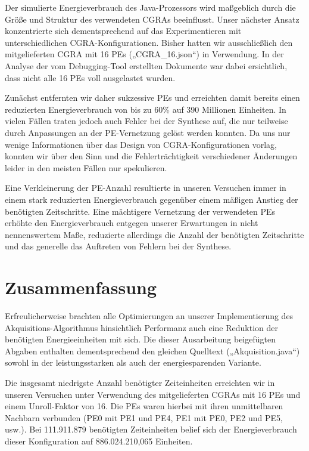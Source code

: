 \documentclass[parskip,
							 oneside,
							 11pt,
							 noheadingspace,
							 accentcolor=tud1d,
							 bigchapter,
							 colorback]{tudreport}
\begin{document}
Der simulierte Energieverbrauch des Java-Prozessors wird maßgeblich durch die Größe und Struktur des verwendeten CGRAs beeinflusst. Unser nächster Ansatz konzentrierte sich dementsprechend auf das Experimentieren mit unterschiedlichen CGRA-Konfigurationen. Bisher hatten wir ausschließlich den mitgelieferten CGRA mit 16 PEs („CGRA\_16.json“) in Verwendung. In der Analyse der vom Debugging-Tool erstellten Dokumente war dabei ersichtlich, dass nicht alle 16 PEs voll ausgelastet wurden.

Zunächst entfernten wir daher sukzessive PEs und erreichten damit bereits einen reduzierten Energieverbrauch von bis zu 60\% auf 390 Millionen Einheiten. In vielen Fällen traten jedoch auch Fehler bei der Synthese auf, die nur teilweise durch Anpassungen an der PE-Vernetzung gelöst werden konnten. Da uns nur wenige Informationen über das Design von CGRA-Konfigurationen vorlag, konnten wir über den Sinn und die Fehlerträchtigkeit verschiedener Änderungen leider in den meisten Fällen nur spekulieren.

Eine Verkleinerung der PE-Anzahl resultierte in unseren Versuchen immer in einem stark reduzierten Energieverbrauch gegenüber einem mäßigen Anstieg der benötigten Zeitschritte. Eine mächtigere Vernetzung der verwendeten PEs erhöhte den Energieverbrauch entgegen unserer Erwartungen in nicht nennenswertem Maße, reduzierte allerdings die Anzahl der benötigten Zeitschritte und das generelle das Auftreten von Fehlern bei der Synthese.

\chapter{Zusammenfassung}
Erfreulicherweise brachten alle Optimierungen an unserer Implementierung des Akquisitions-Algorithmus hinsichtlich Performanz auch eine Reduktion der benötigten Energieeinheiten mit sich. Die dieser Ausarbeitung beigefügten Abgaben enthalten dementsprechend den gleichen Quelltext („Akquisition.java“) sowohl in der leistungsstarken als auch der energiesparenden Variante.

Die insgesamt niedrigste Anzahl benötigter Zeiteinheiten erreichten wir in unseren Versuchen unter Verwendung des mitgelieferten CGRAs mit 16 PEs und einem Unroll-Faktor von 16. Die PEs waren hierbei mit ihren unmittelbaren Nachbarn verbunden (PE0 mit PE1 und PE4, PE1 mit PE0, PE2 und PE5, usw.). Bei 111.911.879 benötigten Zeiteinheiten belief sich der Energieverbrauch dieser Konfiguration auf 886.024.210,065 Einheiten.
\end{document}
